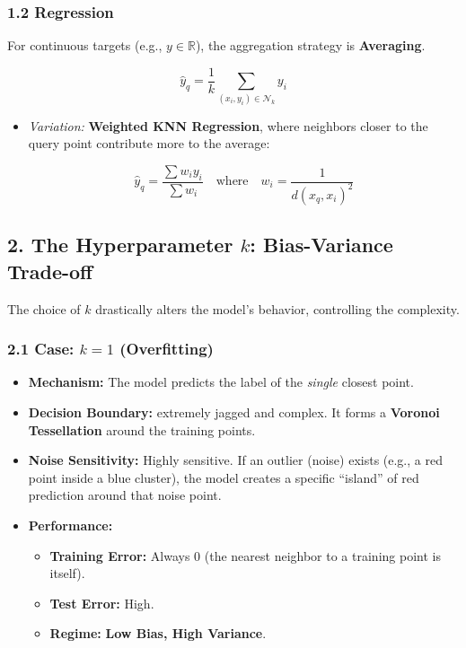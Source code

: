\documentclass[
  italian,
  11pt,
]{article}
\begin{document}
\subsubsection{1.2 Regression}\label{regression}

For continuous targets (e.g., \(y \in \mathbb{R}\)), the aggregation
strategy is \textbf{Averaging}.

\[\hat{y}_q = \frac{1}{k} \sum_{(x_i, y_i) \in \mathcal{N}_k} y_i\]

\begin{itemize}
\item
  \emph{Variation:} \textbf{Weighted KNN Regression}, where neighbors
  closer to the query point contribute more to the average:

  \[\hat{y}_q = \frac{\sum w_i y_i}{\sum w_i} \quad \text{where} \quad w_i = \frac{1}{d(x_q, x_i)^2}\]
\end{itemize}

\subsection{\texorpdfstring{2. The Hyperparameter \(k\): Bias-Variance
Trade-off}{2. The Hyperparameter k: Bias-Variance Trade-off}}\label{the-hyperparameter-k-bias-variance-trade-off}

The choice of \(k\) drastically alters the model's behavior, controlling
the complexity.

\subsubsection{\texorpdfstring{2.1 Case: \(k=1\)
(Overfitting)}{2.1 Case: k=1 (Overfitting)}}\label{case-k1-overfitting}

\begin{itemize}
\item
  \textbf{Mechanism:} The model predicts the label of the \emph{single}
  closest point.
\item
  \textbf{Decision Boundary:} extremely jagged and complex. It forms a
  \textbf{Voronoi Tessellation} around the training points.
\item
  \textbf{Noise Sensitivity:} Highly sensitive. If an outlier (noise)
  exists (e.g., a red point inside a blue cluster), the model creates a
  specific ``island'' of red prediction around that noise point.
\item
  \textbf{Performance:}

  \begin{itemize}
  \item
    \textbf{Training Error:} Always 0 (the nearest neighbor to a
    training point is itself).
  \item
    \textbf{Test Error:} High.
  \item
    \textbf{Regime:} \textbf{Low Bias, High Variance}.
  \end{itemize}
\end{itemize}
\end{document}
